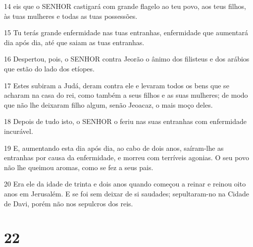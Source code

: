 \par 14 eis que o SENHOR castigará com grande flagelo ao teu povo, aos teus filhos, às tuas mulheres e todas as tuas possessões.
\par 15 Tu terás grande enfermidade nas tuas entranhas, enfermidade que aumentará dia após dia, até que saiam as tuas entranhas.
\par 16 Despertou, pois, o SENHOR contra Jeorão o ânimo dos filisteus e dos arábios que estão do lado dos etíopes.
\par 17 Estes subiram a Judá, deram contra ele e levaram todos os bens que se acharam na casa do rei, como também a seus filhos e as suas mulheres; de modo que não lhe deixaram filho algum, senão Jeoacaz, o mais moço deles.
\par 18 Depois de tudo isto, o SENHOR o feriu nas suas entranhas com enfermidade incurável.
\par 19 E, aumentando esta dia após dia, ao cabo de dois anos, saíram-lhe as entranhas por causa da enfermidade, e morreu com terríveis agonias. O seu povo não lhe queimou aromas, como se fez a seus pais.
\par 20 Era ele da idade de trinta e dois anos quando começou a reinar e reinou oito anos em Jerusalém. E se foi sem deixar de si saudades; sepultaram-no na Cidade de Davi, porém não nos sepulcros dos reis.

\chapter{22}

